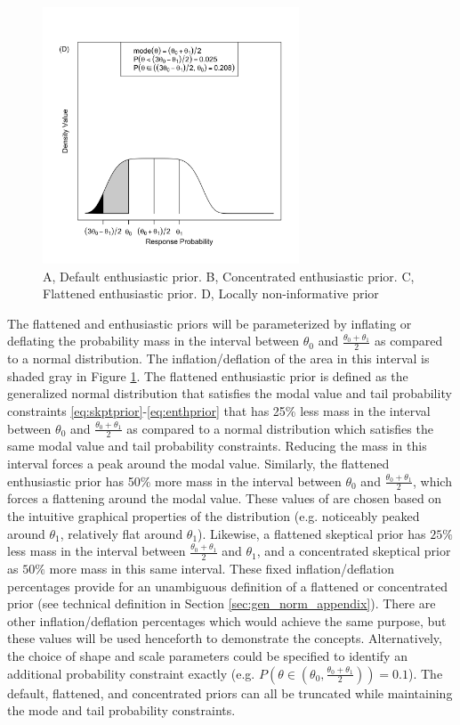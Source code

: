 \documentclass[useAMS,usenatbib,referee]{biom}
\begin{document}
\begin{figure}
\begin{center}
\includegraphics[width=3in]{figure1d.png}
\caption{A, Default enthusiastic prior. B, Concentrated enthusiastic prior. C, Flattened enthusiastic prior. D, Locally non-informative prior}

\label{fig:figure1}
\end{center}
\end{figure}
The flattened and enthusiastic priors will be parameterized by inflating or deflating the probability mass in the interval between $\theta_0$ and $\frac{\theta_0+\theta_1}{2}$ as compared to a normal distribution. The inflation/deflation of the area in this interval is shaded gray in Figure \ref{fig:figure1}. The flattened enthusiastic prior is defined as the generalized normal distribution that satisfies the modal value and tail probability constraints \eqref{eq:skptprior}-\eqref{eq:enthprior} that has 25\% less mass in the interval between $\theta_0$ and $\frac{\theta_0+\theta_1}{2}$ as compared to a normal distribution which satisfies the same modal value and tail probability constraints. Reducing the mass in this interval forces a peak around the modal value. Similarly, the flattened enthusiastic prior has 50\% more mass in the interval between $\theta_0$ and $\frac{\theta_0+\theta_1}{2}$, which forces a flattening around the modal value. These values of are chosen based on the intuitive graphical properties of the distribution (e.g. noticeably peaked around $\theta_1$, relatively flat around $\theta_1$). Likewise, a flattened skeptical prior has $25\%$ less mass in the interval between $\frac{\theta_0+\theta_1}{2}$ and $\theta_1$, and a concentrated skeptical prior as $50\%$ more mass in this same interval. These fixed inflation/deflation percentages provide for an unambiguous definition of a flattened or concentrated prior (see technical definition in Section \ref{sec:gen_norm_appendix}). There are other inflation/deflation percentages which would achieve the same purpose, but these values will be used henceforth to demonstrate the concepts. Alternatively, the choice of shape and scale parameters could be specified to identify an additional probability constraint exactly (e.g. $P(\theta\in(\theta_0,\frac{\theta_0+\theta_1}{2}))=0.1$). The default, flattened, and concentrated priors can all be truncated while maintaining the mode and tail probability constraints.
\end{document}
